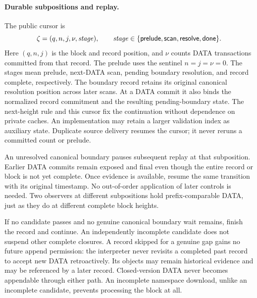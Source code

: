 \paragraph{Durable subpositions and replay.}
\label{sec:subpositions}
The public cursor is
\[
 \zeta=(q,n,j,\nu,\mathit{stage}),\qquad
 \mathit{stage}\in\{\mathsf{prelude},\mathsf{scan},\mathsf{resolve},\mathsf{done}\}.
\]
Here $(q,n,j)$ is the block and record position, and $\nu$ counts DATA
transactions committed from that record. The prelude uses the sentinel
$n=j=\nu=0$. The stages mean prelude, next-DATA scan, pending boundary
resolution, and record complete, respectively. The boundary record
retains its original canonical resolution position across later scans.
At a DATA commit it also binds the normalized record commitment and
the resulting pending-boundary state. The next-height rule and this
cursor fix the continuation without dependence on private caches.
An implementation may retain a larger validation index as auxiliary
state. Duplicate source delivery resumes the cursor; it never reruns
a committed count or prelude.

An unresolved canonical boundary pauses subsequent replay at that
subposition. Earlier DATA commits remain exposed and final even though
the entire record or block is not yet complete. Once evidence is
available, resume the same transition with its original timestamp.
No out-of-order application of later controls is needed. Two observers
at different subpositions hold prefix-comparable DATA, just as they do
at different complete block heights.

If no candidate passes and no genuine canonical boundary wait remains,
finish the record and continue. An independently incomplete candidate
does not suspend other complete closures. A record skipped for a genuine
gap gains no future append permission: the interpreter never revisits
a completed past record to accept new DATA retroactively. Its objects
may remain historical evidence and may be referenced by a later record.
Closed-version DATA never becomes appendable through either path.
An incomplete namespace download, unlike an incomplete candidate,
prevents processing the block at all.

